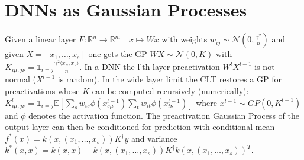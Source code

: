 \section*{DNNs as Gaussian Processes}
Given a linear layer \(F:\mathbb{R}^n \to \mathbb{R}^m\quad x \mapsto Wx\) with weights \(w_{ij} \sim \mathcal{N}(0, \frac{\gamma^2}{n})\) and given \(X = [x_1, \ldots, x_s]\) one gets the GP \(WX \sim \mathcal{N}(0, K)\) with \(K_{i\mu, j\nu} = \mathds{1}_{i=j}\frac{\gamma^2 \langle x_\mu, x_\nu \rangle}{n}\). In a DNN the l'th layer preactivation \(W^l X^{l-1}\) is not normal ($X^{l-1}$ is random). In the wide layer limit the CLT restores a GP for preactivations whose \(K\) can be computed recursively (numerically): $K_{i \mu, j \nu}^l = \mathds{1}_{i=j} \mathbb{E}[\sum_s w_{is}\phi(x_{s\mu}^{l-1}) \sum_t w_{it}\phi(x_{t\nu}^{l-1})]$ where $x^{l-1} \sim GP(0, K^{l-1})$ and $\phi$ denotes the activation function. The preactivation Gaussian Process of the output layer can then be conditioned for prediction with conditional mean $f^*(x) = k(x, (x_1, \ldots, x_s)) K^\dagger y$ and variance $k^*(x,x) = k(x,x) - k(x, (x_1, \ldots, x_s)) K^\dagger k(x, (x_1, \ldots, x_s))^T$.
